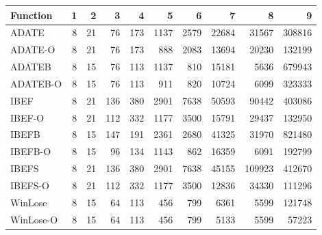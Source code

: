 \begin{table}[ht]
\centering
\begin{tabular}{lrrrrrrrrr}
  \hline
Function & 1 & 2 & 3 & 4 & 5 & 6 & 7 & 8 & 9 \\ 
  \hline
ADATE &   8 &  21 &  76 & 173 & 1137 & 2579 & 22684 & 31567 & 308816 \\ 
  ADATE-O &   8 &  21 &  76 & 173 & 888 & 2083 & 13694 & 20230 & 132199 \\ 
  ADATEB &   8 &  15 &  76 & 113 & 1137 & 810 & 15181 & 5636 & 679943 \\ 
  ADATEB-O &   8 &  15 &  76 & 113 & 911 & 820 & 10724 & 6099 & 323333 \\ 
  IBEF &   8 &  21 & 136 & 380 & 2901 & 7638 & 50593 & 90442 & 403086 \\ 
  IBEF-O &   8 &  21 & 112 & 332 & 1177 & 3500 & 15791 & 29437 & 132950 \\ 
  IBEFB &   8 &  15 & 147 & 191 & 2361 & 2680 & 41325 & 31970 & 821480 \\ 
  IBEFB-O &   8 &  15 &  96 & 134 & 1143 & 862 & 16359 & 6091 & 192799 \\ 
  IBEFS &   8 &  21 & 136 & 380 & 2901 & 7638 & 45155 & 109923 & 412670 \\ 
  IBEFS-O &   8 &  21 & 112 & 332 & 1177 & 3500 & 12836 & 34330 & 111296 \\ 
  WinLose &   8 &  15 &  64 & 113 & 456 & 799 & 6361 & 5599 & 121748 \\ 
  WinLose-O &   8 &  15 &  64 & 113 & 456 & 799 & 5133 & 5599 & 57223 \\ 
   \hline
\end{tabular}
\end{table}
